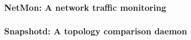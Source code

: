 \subsubsection{NetMon: A network traffic monitoring}

\subsubsection{Snapshotd: A topology comparison daemon}